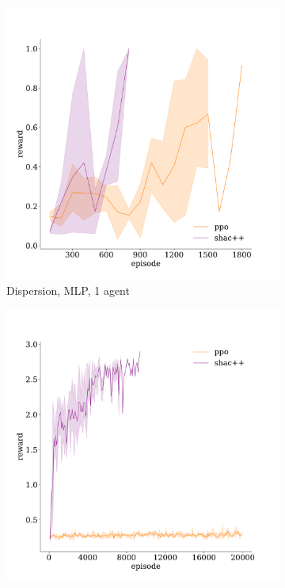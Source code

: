 
\begin{figure}[!t]
    \centering
    \begin{subfigure}[b]{0.32\textwidth}
        \includegraphics[width=\textwidth]{figs/dispersion-1-mlp.pdf}
        \caption{Dispersion, MLP, 1 agent}
        \label{fig:dispersion-mlp-1}
    \end{subfigure}
    \begin{subfigure}[b]{0.32\textwidth}
        \includegraphics[width=\textwidth]{figs/dispersion-3-transformer.pdf}

\end{subfigure}
\end{figure}
